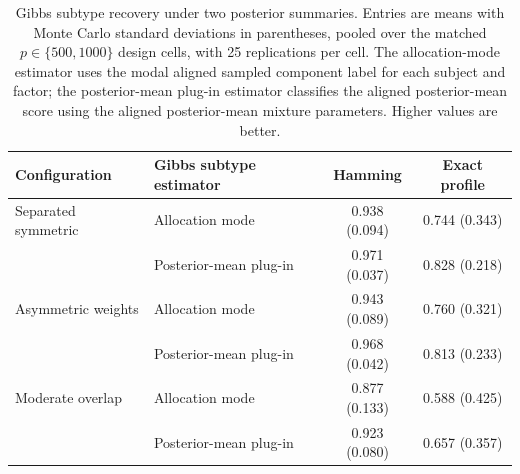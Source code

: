 \begin{table}[t]
\centering
\caption{Gibbs subtype recovery under two posterior summaries. Entries are means with Monte Carlo standard deviations in parentheses, pooled over the matched $p\in\{500,1000\}$ design cells, with 25 replications per cell. The allocation-mode estimator uses the modal aligned sampled component label for each subject and factor; the posterior-mean plug-in estimator classifies the aligned posterior-mean score using the aligned posterior-mean mixture parameters. Higher values are better.}
\label{tab:gibbs_subtype_estimators}
\begin{tabular}{llcc}
\toprule
Configuration & Gibbs subtype estimator & Hamming & Exact profile \\
\midrule
Separated symmetric & Allocation mode & 0.938 (0.094) & 0.744 (0.343) \\
 & Posterior-mean plug-in & 0.971 (0.037) & 0.828 (0.218) \\
\addlinespace
Asymmetric weights & Allocation mode & 0.943 (0.089) & 0.760 (0.321) \\
 & Posterior-mean plug-in & 0.968 (0.042) & 0.813 (0.233) \\
\addlinespace
Moderate overlap & Allocation mode & 0.877 (0.133) & 0.588 (0.425) \\
 & Posterior-mean plug-in & 0.923 (0.080) & 0.657 (0.357) \\
\bottomrule
\end{tabular}
\end{table}
